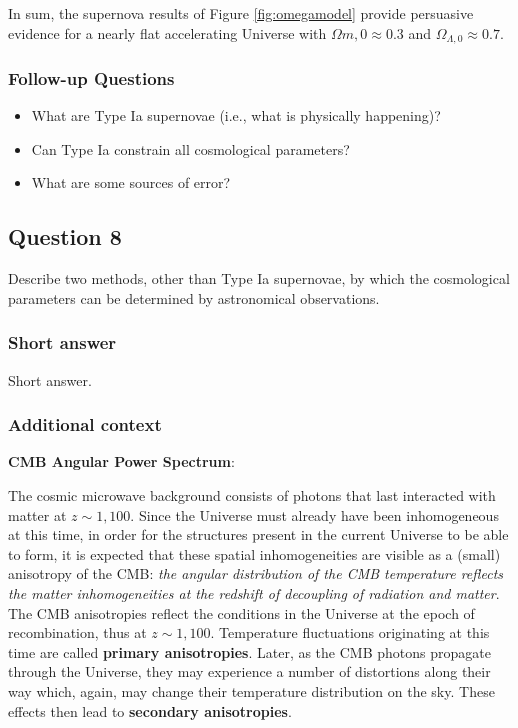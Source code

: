 \documentclass[a4paper,11pt]{article}
\begin{document}
{\noindent}In sum, the supernova results of Figure \ref{fig:omegamodel} provide persuasive evidence for a nearly flat accelerating Universe with $\Omega{m,0}\approx0.3$ and $\Omega_{\Lambda,0}≈ 0.7$.

\subsubsection{Follow-up Questions}

\begin{itemize}
    \item What are Type Ia supernovae (i.e., what is physically happening)?
    \item Can Type Ia constrain all cosmological parameters?
    \item What are some sources of error?
\end{itemize}

%
%

\newpage
\subsection{Question 8}

Describe two methods, other than Type Ia supernovae, by which the cosmological parameters can be determined by astronomical observations.

\subsubsection{Short answer}

Short answer.

\subsubsection{Additional context}

\textbf{CMB Angular Power Spectrum}:

{\noindent}The cosmic microwave background consists of photons that last interacted with matter at $z\sim1,100$. Since the Universe must already have been inhomogeneous at this time, in order for the structures present in the current Universe to be able to form, it is expected that these spatial inhomogeneities are visible as a (small) anisotropy of the CMB: \textit{the angular distribution of the CMB temperature reflects the matter inhomogeneities at the redshift of decoupling of radiation and matter}. The CMB anisotropies reflect the conditions in the Universe at the epoch of recombination, thus at $z\sim1,100$. Temperature fluctuations originating at this time are called \textbf{primary anisotropies}. Later, as the CMB photons propagate through the Universe, they may experience a number of distortions along their way which, again, may change their temperature distribution on the sky. These effects then lead to \textbf{secondary anisotropies}.
\end{document}
